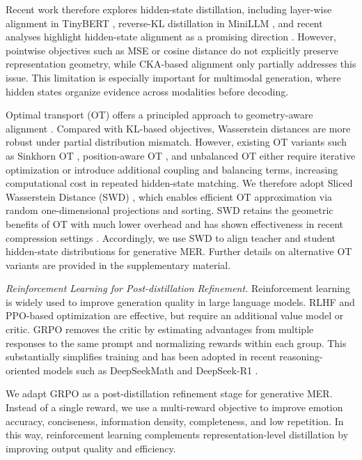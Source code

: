 \documentclass[sigconf]{acmart}
\begin{document}
Recent work therefore explores hidden-state distillation, including layer-wise alignment in TinyBERT \cite{jiao2020}, reverse-KL distillation in MiniLLM \cite{gu2026mini}, and recent analyses highlight hidden-state alignment as a promising direction \cite{dasgupta2025improving}.
However, pointwise objectives such as MSE or cosine distance do not explicitly preserve representation geometry, while CKA-based alignment \cite{zhou2024} only partially addresses this issue.
This limitation is especially important for multimodal generation, where hidden states organize evidence across modalities before decoding.

Optimal transport (OT) offers a principled approach to geometry-aware alignment \cite{cui2024,lv2024,zhuang2025frequency}. Compared with KL-based objectives, Wasserstein distances are more robust under partial distribution mismatch. However, existing OT variants such as Sinkhorn OT \cite{NIPS2013_af21d0c9}, position-aware OT \cite{PAOT}, and unbalanced OT \cite{UnbalancedOT} either require iterative optimization or introduce additional coupling and balancing terms, increasing computational cost in repeated hidden-state matching. We therefore adopt Sliced Wasserstein Distance (SWD) \cite{kolouri2019}, which enables efficient OT approximation via random one-dimensional projections and sorting. SWD retains the geometric benefits of OT with much lower overhead and has shown effectiveness in recent compression settings \cite{quetu2025}. Accordingly, we use SWD to align teacher and student hidden-state distributions for generative MER.
Further details on alternative OT variants are provided in the supplementary material.

\noindent \emph{Reinforcement Learning for Post-distillation Refinement.}
Reinforcement learning is widely used to improve generation quality in large language models.
RLHF \cite{ouyang2022} and PPO-based optimization \cite{schulman2017} are effective, but require an additional value model or critic.
GRPO \cite{shao2024} removes the critic by estimating advantages from multiple responses to the same prompt and normalizing rewards within each group.
This substantially simplifies training and has been adopted in recent reasoning-oriented models such as DeepSeekMath \cite{shao2024} and DeepSeek-R1 \cite{Guo_2025}.

We adapt GRPO as a post-distillation refinement stage for generative MER. Instead of a single reward, we use a multi-reward objective to improve emotion accuracy, conciseness, information density, completeness, and low repetition. In this way, reinforcement learning complements representation-level distillation by improving output quality and efficiency.
\end{document}

